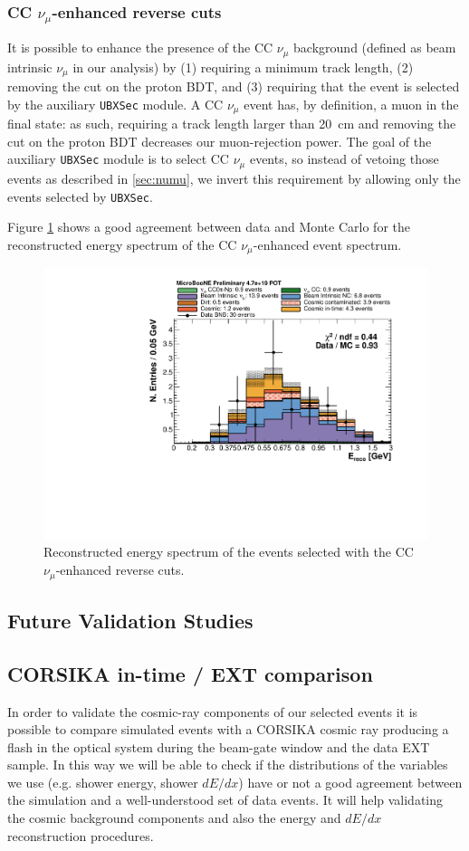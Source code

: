 \subsubsection{CC \texorpdfstring{$\nu_{\mu}$}{numu}-enhanced reverse cuts}
It is possible to enhance the presence of the CC $\nu_{\mu}$ background (defined as beam intrinsic $\nu_{\mu}$ in our analysis) by (1) requiring a minimum track length, (2) removing the cut on the proton BDT, and (3) requiring that the event is selected by the auxiliary \texttt{UBXSec} module. 
A CC $\nu_{\mu}$ event has, by definition, a muon in the final state: as such, requiring a track length larger than 20~cm and removing the cut on the proton BDT decreases our muon-rejection power. The goal of the auxiliary \texttt{UBXSec} module is to select CC $\nu_{\mu}$ events, so instead of vetoing those events as described in \ref{sec:numu}, we invert this requirement by allowing only the events selected by \texttt{UBXSec}.

Figure \ref{fig:numu_inverted} shows a good agreement between data and Monte Carlo for the reconstructed energy spectrum of the CC $\nu_{\mu}$-enhanced event spectrum.

\begin{figure}[htbp]
\centering
  \includegraphics[width=0.65\linewidth]{figures/numu_reco.pdf}
  \caption{Reconstructed energy spectrum of the events selected with the CC $\nu_{\mu}$-enhanced reverse cuts.}\label{fig:numu_inverted}
\end{figure}

\subsection{Future Validation Studies}

\subsection{CORSIKA in-time / EXT comparison}
In order to validate the cosmic-ray components of our selected events it is possible to compare simulated events with a CORSIKA cosmic ray producing a flash in the optical system during the beam-gate window and the data EXT sample. 
In this way we will be able to check if the distributions of the variables we use (e.g. shower energy, shower $dE/dx$) have or not a good agreement between the simulation and a well-understood set of data events. 
It will help validating the cosmic background components and also the energy and $dE/dx$ reconstruction procedures.

